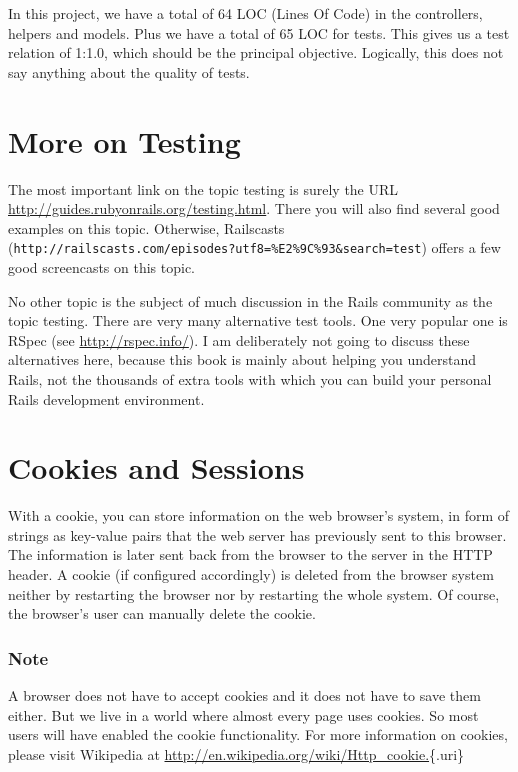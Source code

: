 \documentclass[a4paper]{book}
\newcommand{\chap}[1]{\newpage\thispagestyle{empty}\chapter{#1}\label{chap:\thechapter}}
\begin{document}
In this project, we have a total of 64 LOC (Lines Of Code) in the controllers, helpers and models. Plus we have a total of 65 LOC for tests. This gives us a test relation of 1:1.0, which should be the principal objective. Logically, this does not say anything about the quality of tests.

\chap{More on Testing}\label{more-on-testing}

The most important link on the topic testing is surely the URL \url{http://guides.rubyonrails.org/testing.html}. There you will also find several good examples on this topic. Otherwise, Railscasts (\texttt{http://railscasts.com/episodes?utf8=\%E2\%9C\%93\&search=test}) offers a few good screencasts on this topic.

No other topic is the subject of much discussion in the Rails community as the topic testing. There are very many alternative test tools. One very popular one is RSpec (see \url{http://rspec.info/}). I am deliberately not going to discuss these alternatives here, because this book is mainly about helping you understand Rails, not the thousands of extra tools with which you can build your personal Rails development environment.

\chap{Cookies and Sessions}\label{cookies-and-sessions}


With a cookie, you can store information on the web browser's system, in form of strings as key-value pairs that the web server has previously sent to this browser. The information is later sent back from the browser to the server in the HTTP header. A cookie (if configured accordingly) is deleted from the browser system neither by restarting the browser nor by restarting the whole system. Of course, the browser's user can manually delete the cookie.

\subsection{Note}\label{note-43}

A browser does not have to accept cookies and it does not have to save them either. But we live in a world where almost every page uses cookies. So most users will have enabled the cookie functionality. For more information on cookies, please visit Wikipedia at \url{http://en.wikipedia.org/wiki/Http_cookie.}\{.uri\}
\end{document}
